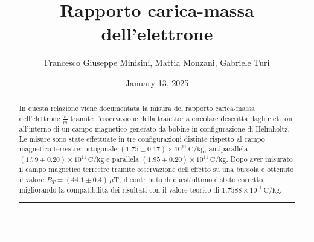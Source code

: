 \documentclass[a4paper,12pt]{article}
\title{Rapporto carica-massa dell'elettrone}
\author{Francesco Giuseppe Minisini, Mattia Monzani, Gabriele Turi}
\date{January 13, 2025}
\begin{document}
\maketitle
\hrule
\vspace{9pt}
\begin{abstract}
    \noindent
    In questa relazione viene documentata la misura del rapporto carica-massa dell'elettrone \(\frac{e}{m}\) tramite l'osservazione della traiettoria circolare descritta dagli elettroni all'interno di un campo magnetico generato da bobine in configurazione di Helmholtz. Le misure sono state effettuate in tre configurazioni distinte rispetto al campo magnetico terrestre: ortogonale \((1.75 \pm 0.17) \times 10^{11} \, \text{C/kg}\), antiparallela \((1.79 \pm 0.20) \times 10^{11} \, \text{C/kg}\) e parallela \((1.95 \pm 0.20) \times 10^{11} \, \text{C/kg}\). Dopo aver misurato il campo magnetico terrestre tramite osservazione dell'effetto su una bussola e ottenuto il valore \(B_T = (44.1 \pm 0.4) \, \mu\text{T}\), il contributo di quest'ultimo è stato corretto, migliorando la compatibilità dei risultati con il valore teorico di \(1.7588 \times 10^{11} \, \text{C/kg}\).
    
\vspace{20pt}
\hrule
\end{abstract}
\vspace{2 pt}
\end{document}
